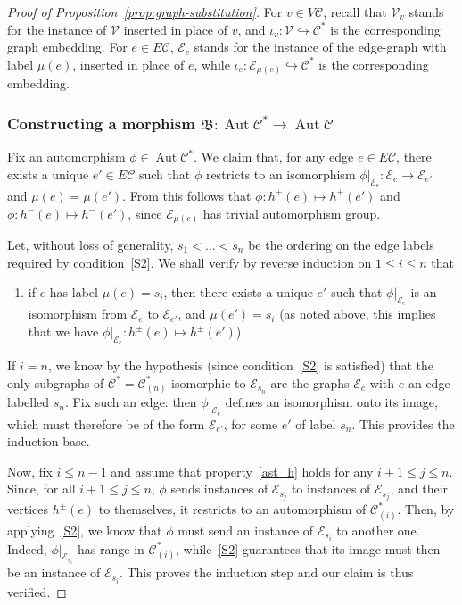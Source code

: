 \documentclass[10pt,a4paper]{amsart}
\theoremstyle{definition}
\newcommand{\cC}{\mathcal{C}}
\newcommand{\cV}{\mathcal{V}}
\newcommand{\cE}{\mathcal{E}}
\DeclareMathOperator{\aut}{Aut}
\newcommand{\Con}{\mathfrak{B}}
\begin{document}
 
\begin{proof}[Proof of Proposition~\ref{prop:graph-substitution}] For $v\in V\cC$, recall that $\cV_v$ stands for the instance of $\cV$ inserted in place of $v$, and ${\iota}_v:\cV {\hookrightarrow} \cC^*$ is the corresponding graph embedding. For $e\in E\cC$, $\cE_e$ stands for the instance of the edge-graph with label $\mu(e)$, inserted in place of $e$, while ${\iota}_e:\cE_{{\mu}(e)}{\hookrightarrow} \cC^*$ is the corresponding embedding.

 
\subsubsection*{Constructing a morphism $\Con: \aut \cC^* \to \aut \cC$} Fix an automorphism $\phi \in \aut \cC^*$. We claim that, for any edge $e\in E\cC$, there exists a unique $e'\in E\cC$ such that ${\phi}$ restricts to an isomorphism ${\phi}|_{\cE_e}:\cE_e \to \cE_{e'}$ and ${\mu}(e) = {\mu}(e')$. From this follows that ${\phi}:h^{+}(e) \mapsto h^{+}(e')$ and ${\phi}:h^{-}(e) \mapsto h^{-}(e')$, since $\cE_{{\mu}(e)}$ has trivial automorphism group.

Let, without loss of generality, $s_{1} < \dots < s_n$ be the ordering on the edge labels required by condition~\ref{S2}. We shall verify by reverse induction on $1\leq i\leq n$ that 

\begin{enumerate}
\renewcommand{\theenumi}{$\ast$}
\renewcommand{\labelenumi}{(\theenumi)}
\item\label{ast_h} if $e$ has label $\mu(e) = s_i$, then there exists a unique $e'$ such that ${\phi}|_{\cE_e}$ is an isomorphism from $\cE_e$ to $\cE_{e'}$, and $\mu(e')=s_i$ (as noted above, this implies that we have ${\phi}|_{\cE_e}: h^{\pm}(e) \mapsto h^{\pm}(e')$).
\end{enumerate} 

If $i=n$, we know by the hypothesis (since condition~\ref{S2} is satisfied) that the only subgraphs of $\cC^*=\cC^*_{(n)}$ isomorphic to $\cE_{s_{n}}$ are the graphs $\cE_e$ with $e$ an edge labelled $s_{n}$. Fix such an edge: then ${\phi}|_{\cE_e}$ defines an isomorphism onto its image, which must therefore be of the form $\cE_{e'}$, for some $e'$ of label $s_{n}$. This provides the induction base.
 
Now, fix $i \leq n-1$ and assume that property~\eqref{ast_h} holds for any $i+1\leq j\leq n$. Since, for all $i+1\leq j\leq n$, ${\phi}$ sends instances of $\cE_{s_j}$ to instances of $\cE_{s_j}$, and their vertices $h^{\pm}(e)$ to themselves, it restricts to an automorphism of $\cC^*_{(i)}$. Then, by applying~\ref{S2}, we know that ${\phi}$ must send an instance of $\cE_{s_{i}}$ to another one. Indeed, ${\phi}|_{\cE_{s_{i}}}$ has range in $\cC^*_{(i)}$, while~\ref{S2} guarantees that its image must then be an instance of $\cE_{s_{i}}$. This proves the induction step and our claim is thus verified.
 


\end{proof}
\end{document}
